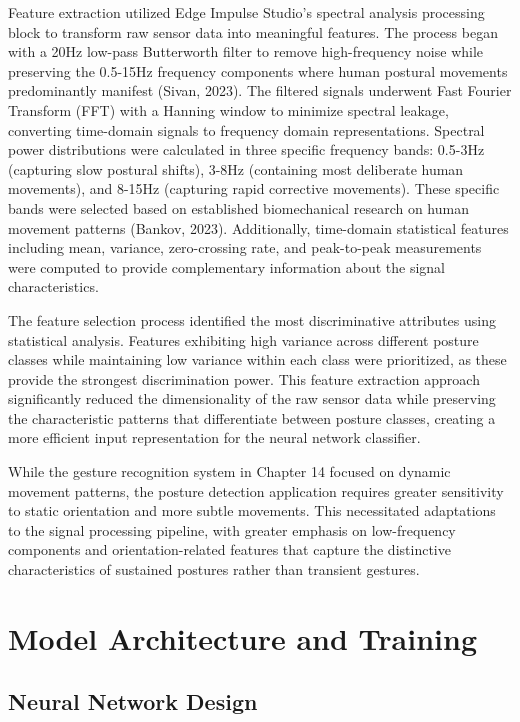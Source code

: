 \documentclass[
  9pt,
  letterpaper,
  abstract,
  titlepage]{scrbook}
\begin{document}
Feature extraction utilized Edge Impulse Studio's spectral analysis
processing block to transform raw sensor data into meaningful features.
The process began with a 20Hz low-pass Butterworth filter to remove
high-frequency noise while preserving the 0.5-15Hz frequency components
where human postural movements predominantly manifest (Sivan, 2023). The
filtered signals underwent Fast Fourier Transform (FFT) with a Hanning
window to minimize spectral leakage, converting time-domain signals to
frequency domain representations. Spectral power distributions were
calculated in three specific frequency bands: 0.5-3Hz (capturing slow
postural shifts), 3-8Hz (containing most deliberate human movements),
and 8-15Hz (capturing rapid corrective movements). These specific bands
were selected based on established biomechanical research on human
movement patterns (Bankov, 2023). Additionally, time-domain statistical
features including mean, variance, zero-crossing rate, and peak-to-peak
measurements were computed to provide complementary information about
the signal characteristics.

The feature selection process identified the most discriminative
attributes using statistical analysis. Features exhibiting high variance
across different posture classes while maintaining low variance within
each class were prioritized, as these provide the strongest
discrimination power. This feature extraction approach significantly
reduced the dimensionality of the raw sensor data while preserving the
characteristic patterns that differentiate between posture classes,
creating a more efficient input representation for the neural network
classifier.

While the gesture recognition system in Chapter 14 focused on dynamic
movement patterns, the posture detection application requires greater
sensitivity to static orientation and more subtle movements. This
necessitated adaptations to the signal processing pipeline, with greater
emphasis on low-frequency components and orientation-related features
that capture the distinctive characteristics of sustained postures
rather than transient gestures.

\section{Model Architecture and
Training}\label{model-architecture-and-training}

\subsection{Neural Network Design}\label{neural-network-design}
\end{document}
